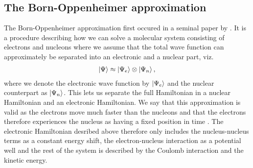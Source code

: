         \subsection{The Born-Oppenheimer approximation}
            The Born-Oppenheimer approximation first occured in a seminal paper
            by \citeauthor{born1927quantentheorie}
            \cite{born1927quantentheorie}.
            It is a procedure describing how we can solve a molecular system
            consisting of electrons and nucleons where we assume that the total
            wave function can approximately be separated into an electronic and
            a nuclear part, viz.
            \begin{align}
                \ket{\Psi} \approx \ket{\Psi_e}\otimes\ket{\Psi_n},
            \end{align}
            where we denote the electronic wave function by $\ket{\Psi_e}$ and
            the nuclear counterpart as $\ket{\Psi_n}$.
            This lets us separate the full Hamiltonian in a nuclear Hamiltonian
            and an electronic Hamiltonian.
            We say that this approximation is valid as the electrons move much
            faster than the nucleons and that the electrons therefore
            experiences the nucleus as having a fixed position in time
            \cite{mayer2003simple}.
            The electronic Hamiltonian desribed above therefore only includes
            the nucleus-nucleus terms as a constant energy shift, the
            electron-nucleus interaction as a potential well and the rest of the
            system is described by the Coulomb interaction and the kinetic
            energy.


